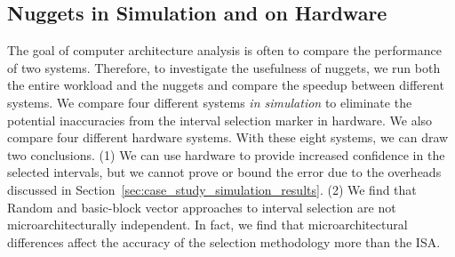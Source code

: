 \subsection{Nuggets in Simulation and on Hardware}\label{sec:model_performance_evaluation}


The goal of computer architecture analysis is often to compare the performance of two systems.
Therefore, to investigate the usefulness of nuggets, we run both the entire workload and the nuggets and compare the speedup between different systems.
We compare four different systems \emph{in simulation} to eliminate the potential inaccuracies from the interval selection marker in hardware.
We also compare four different hardware systems.
With these eight systems, we can draw two conclusions.
(1) We can use hardware to provide increased confidence in the selected intervals, but we cannot prove or bound the error due to the overheads discussed in Section~\ref{sec:case_study_simulation_results}.
(2) We find that Random and basic-block vector approaches to interval selection are not microarchitecturally independent.
In fact, we find that microarchitectural differences affect the accuracy of the selection methodology more than the ISA.



